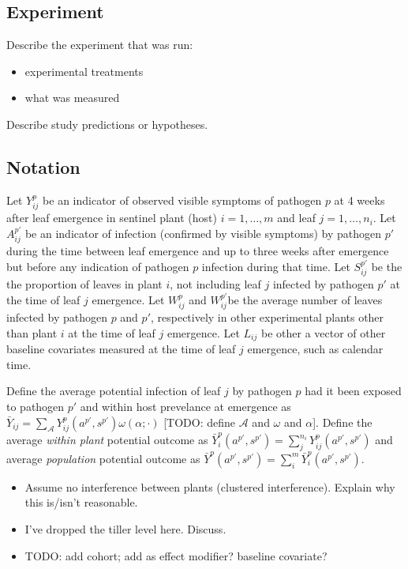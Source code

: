 \documentclass[]{article}
\providecommand{\tightlist}{%
  \setlength{\itemsep}{0pt}\setlength{\parskip}{0pt}}
\begin{document}
\hypertarget{experiment}{%
\subsection{Experiment}\label{experiment}}

Describe the experiment that was run:

\begin{itemize}
\tightlist
\item
  experimental treatments
\item
  what was measured
\end{itemize}

Describe study predictions or hypotheses.

\hypertarget{notation}{%
\subsection{Notation}\label{notation}}

Let \(Y^p_{ij}\) be an indicator of observed visible symptoms of
pathogen \(p\) at 4 weeks after leaf emergence in sentinel plant (host)
\(i = 1, \dots, m\) and leaf \(j = 1, \dots, n_i\). Let \(A^{p'}_{ij}\)
be an indicator of infection (confirmed by visible symptoms) by pathogen
\(p'\) during the time between leaf emergence and up to three weeks
after emergence but before any indication of pathogen \(p\) infection
during that time. Let \(S^{p'}_{ij}\) be the the proportion of leaves in
plant \(i\), not including leaf \(j\) infected by pathogen \(p'\) at the
time of leaf \(j\) emergence. Let \(W^{p}_{ij}\) and \(W^{p'}_{ij}\)be
the average number of leaves infected by pathogen \(p\) and \(p'\),
respectively in other experimental plants other than plant \(i\) at the
time of leaf \(j\) emergence. Let \(L_{ij}\) be other a vector of other
baseline covariates measured at the time of leaf \(j\) emergence, such
as calendar time.

Define the average potential infection of leaf \(j\) by pathogen \(p\)
had it been exposed to pathogen \(p'\) and within host prevelance at
emergence as
\(\bar{Y}_{ij} = \sum_{\mathcal{A}} Y^p_{ij}(a^{p'}, s^{p'}) \omega(\alpha; \cdot)\)
{[}TODO: define \(\mathcal{A}\) and \(\omega\) and \(\alpha\){]}. Define
the average \emph{within plant} potential outcome as
\(\bar{Y}^p_i(a^{p'}, s^{p'}) = \sum_{j}^{n_i} Y^p_{ij}(a^{p'}, s^{p'})\)
and average \emph{population} potential outcome as
\(\bar{Y}^p(a^{p'}, s^{p'}) = \sum_{i}^{m} \bar{Y}^p_{i}(a^{p'}, s^{p'})\).

\begin{itemize}
\tightlist
\item
  Assume no interference between plants (clustered interference).
  Explain why this is/isn't reasonable.
\item
  I've dropped the tiller level here. Discuss.
\item
  TODO: add cohort; add as effect modifier? baseline covariate?
\end{itemize}
\end{document}
